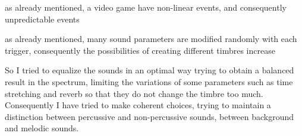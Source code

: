 	\begin{compactitem}
		\item as already mentioned, a video game have non-linear events, and consequently unpredictable events
		\item as already mentioned, many sound parameters are modified randomly with each trigger, consequently the possibilities of creating different timbres increase
	\end{compactitem}
	
	So I tried to equalize the sounds in an optimal way trying to obtain a balanced result in the spectrum, limiting the variations of some parameters such as time stretching and reverb so that they do not change the timbre too much. Consequently I have tried to make coherent choices, trying to maintain a distinction between percussive and non-percussive sounds, between background and melodic sounds.

